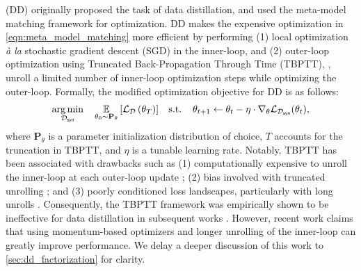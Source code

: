 \documentclass[10pt]{article} %
\begin{document}
\citet{dd_orig} (DD) originally proposed the task of data distillation, and used the meta-model matching framework for optimization. DD makes
the expensive optimization in \cref{eqn:meta_model_matching} more efficient by performing (1) local optimization \emph{\`a la} stochastic gradient descent (SGD) in the inner-loop, and (2) outer-loop optimization using Truncated Back-Propagation Through Time (TBPTT), \ie, unroll a limited number of inner-loop optimization steps while optimizing the outer-loop. Formally, the modified optimization objective for DD is as follows:
\begin{equation} \label{eqn:dd_orig_optimization}
\begin{gathered}
    \underset{\mathcal{D}_{\mathsf{syn}}}{\operatorname{arg} \operatorname{min}} \hspace{0.4cm} \underset{\theta_0 \sim \mathbf{P}_\theta}{\mathbb{E}} \left[\mathcal{L}_{\mathcal{D}}\left(\theta_T\right)\right] \hspace{0.3cm}
    \text{s.t.} \hspace{0.4cm} \theta_{t+1} \leftarrow \theta_t - \eta \cdot \nabla_\theta \mathcal{L}_{\mathcal{D}_{\mathsf{syn}}}(\theta_t),
\end{gathered}
\end{equation}
where $\mathbf{P}_\theta$ is a parameter initialization distribution of choice, $T$ accounts for the truncation in TBPTT, and $\eta$ is a tunable learning rate. Notably, TBPTT has been associated with drawbacks such as (1) computationally expensive to unroll the inner-loop at each outer-loop update \citep{bilevel_bias_variance}; (2) bias involved with truncated unrolling \citep{biased_bptt}; and (3) poorly conditioned loss landscapes, particularly with long unrolls \citep{bptt_loss_landscape}. Consequently, the TBPTT framework was empirically shown to be ineffective for data distillation in subsequent works \citep{zhao_dc}. However, recent work \citep{remember_past} claims that using momentum-based optimizers and longer unrolling of the inner-loop can greatly improve performance. We delay a deeper discussion of this work to \cref{sec:dd_factorization} for clarity. 
\end{document}
